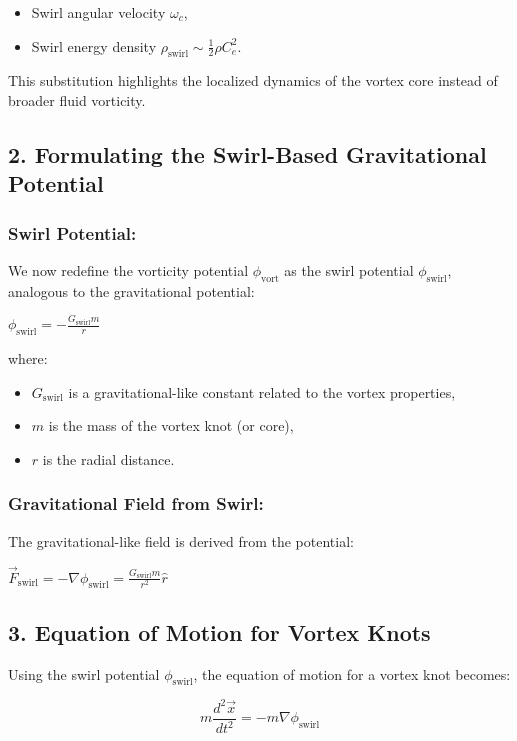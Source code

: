 {\begin{itemize}
\item Swirl angular velocity \(\omega_c\),

\item Swirl energy density \(\rho_{\text{swirl}} \sim \frac{1}{2} \rho C_e^2\).
\end{itemize}
This substitution highlights the localized dynamics of the vortex core instead of broader fluid vorticity.

\subsection*{2. Formulating the Swirl-Based Gravitational Potential}
\subsubsection*{Swirl Potential:}
We now redefine the vorticity potential \(\phi_{\text{vort}}\) as the swirl potential \(\phi_{\text{swirl}}\), analogous to the gravitational potential:

\(\phi_{\text{swirl}} = -\frac{G_{\text{swirl}} m}{r}\)

where:

\begin{itemize}
\item \(G_{\text{swirl}}\) is a gravitational-like constant related to the vortex properties,

\item \(m\) is the mass of the vortex knot (or core),

\item \(r\) is the radial distance.
\end{itemize}
\subsubsection*{Gravitational Field from Swirl:}
The gravitational-like field is derived from the potential:

\(\vec{F}_{\text{swirl}} = -\nabla \phi_{\text{swirl}} = \frac{G_{\text{swirl}} m}{r^2} \hat{r}\)

\subsection*{3. Equation of Motion for Vortex Knots}
Using the swirl potential \(\phi_{\text{swirl}}\), the equation of motion for a vortex knot becomes:

\[m \frac{d^2 \vec{x}}{dt^2} = -m \nabla \phi_{\text{swirl}}\]

}
